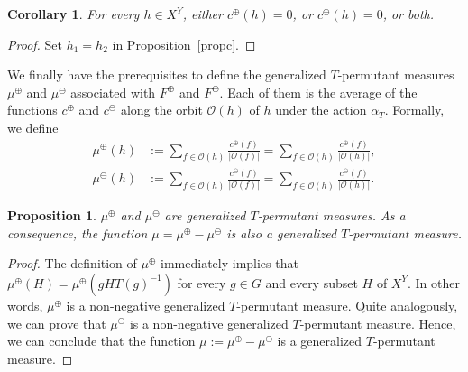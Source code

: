 \documentclass[11pt]{article}
\newcommand{\patrizio}[1]{\textcolor{purple}{#1}}
\newtheorem{corollary}[theorem]{Corollary}
\newtheorem{proposition}[theorem]{Proposition}
\begin{document}
\begin{corollary}
\label{corc}
For every $h\in X^Y$, either $c^\oplus(h)=0$, or $c^\ominus(h)=0$, or both.
\end{corollary}

\begin{proof}
    Set $h_1=h_2$ in Proposition~\ref{propc}.
\end{proof}

We finally have the prerequisites to define the generalized $T$-permutant measures $\mu^\oplus$ and $\mu^\ominus$ associated with $F^\oplus$ and $F^\ominus$. Each of them is the average of the functions $c^\oplus$ and $c^\ominus$ along the orbit $\mathcal{O}(h)$ of $h$ under the action $\alpha_T$. Formally, we define
\begin{align*}
    \mu^\oplus(h) & := \sum_{f \in \mathcal{O}(h)} \frac{c^\oplus(f)}{\left|\mathcal{O}(f)\right|} = \sum_{f \in \mathcal{O}(h)} \frac{c^\oplus(f)}{\left|\mathcal{O}(h)\right|}, \\
    \mu^\ominus(h) & := \sum_{f \in \mathcal{O}(h)} \frac{c^\ominus(f)}{\left|\mathcal{O}(f)\right|} = \sum_{f \in \mathcal{O}(h)} \frac{c^\ominus(f)}{\left|\mathcal{O}(h)\right|}.
\end{align*}

\begin{proposition}
\label{prop:gpm}
    $\mu^\oplus$ and $\mu^\ominus$ are generalized $T$-permutant measures. As a consequence, the function $\mu = \mu^\oplus - \mu^\ominus$ is also a generalized $T$-permutant measure.
\end{proposition}

\begin{proof}
    The definition of $\mu^\oplus$ immediately implies that $\mu^\oplus(H) = \mu^\oplus\left(gHT(g)^{-1}\right)$ for every $g \in G$ and every subset $H$ of $X^Y$. In other words, $\mu^\oplus$ is a non-negative generalized $T$-permutant measure. Quite analogously, we can prove that $\mu^\ominus$ is a non-negative generalized $T$-permutant measure. Hence, we can conclude that the function $\mu := \mu^\oplus - \mu^\ominus$ is a generalized $T$-permutant measure.
\end{proof}
\end{document}
